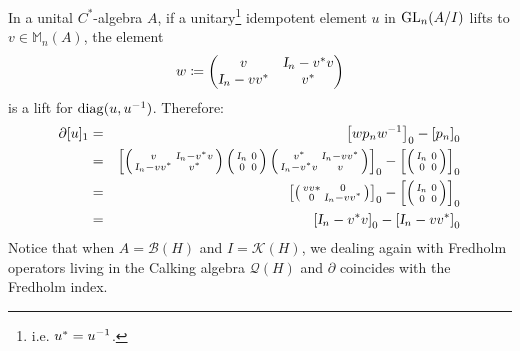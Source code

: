 \begin{exemplo}
    In a unital $C^*$-algebra $A$, if a unitary\footnote{i.e. $u^*= {u}^{-1}$.} idempotent element $u$ in $\operatorname{GL}_n(A/I)$ lifts to $v\in \mathbb M_n(A)$, the element
    \begin{equation*}
        w \coloneqq \begin{pmatrix}
            v &  \textsl{I}_n - v^*v \\ \textsl{I}_n - vv^* & v^*
        \end{pmatrix}
    \end{equation*}
    is a lift for $\operatorname{diag}(u, {u}^{-1})$. Therefore:
    \begin{eqnarray*}
        \partial [u]_1 &=& \left[wp_n \inv w\right]_0 - \left[p_n\right]_0 \\
        &=& \left[\left(\begin{smallmatrix}
            v &  \Id_n - v^*v \\ \Id_n - vv^* & v^*
        \end{smallmatrix}\right)
        \left(\begin{smallmatrix}
            \vphantom{\Id_n-v^*v}\Id_n & 0 \\ \vphantom{\Id_n-v^*v}0 & 0
        \end{smallmatrix}
        \right)\left(\begin{smallmatrix}
            v^* &  \Id_n - vv^* \\ \Id_n - v^*v & v
        \end{smallmatrix}\right)\right]_0 - \left[
            \left(\begin{smallmatrix}
                \vphantom{\Id_n-v^*v}\Id_n & 0 \\ \vphantom{\Id_n-v^*v}0 & 0
            \end{smallmatrix}\right)\right]_0 \\
            &=&  \left[\left(\begin{smallmatrix}
                vv* &  0 \\
                0 & \Id_n- vv^*
            \end{smallmatrix}\right)\right]_0 - \left[
                \left(\begin{smallmatrix}
                    \vphantom{\Id_n-v^*v}\Id_n & 0 \\ \vphantom{\Id_n-v^*v}0 & 0
                \end{smallmatrix}\right)\right]_0 \\
            &=& \left[\Id_n - v^*v\right]_0 - \left[\Id_n-vv^*\right]_0
    \end{eqnarray*}
    Notice that when $A = \mathscr B(H)$ and $I = \mathscr K(H)$, we dealing again with Fredholm operators living in the Calking algebra $\mathscr Q(H)$ and $\partial$ coincides with the Fredholm index. 
\end{exemplo}